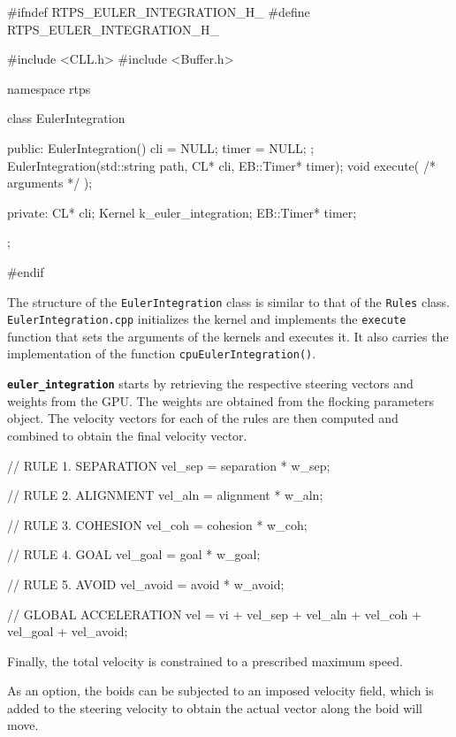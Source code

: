 \begin{cppcode}{0}
#ifndef RTPS_EULER_INTEGRATION_H_
#define RTPS_EULER_INTEGRATION_H_

#include <CLL.h>
#include <Buffer.h>

namespace rtps
{
	class EulerIntegration
	{
		public:
			EulerIntegration() { cli = NULL; timer = NULL; };
	 		EulerIntegration(std::string path, CL* cli, EB::Timer* timer);
			void execute( /* arguments */ );

		private:
			CL* cli;
			Kernel k_euler_integration;
			EB::Timer* timer;
	};
}
#endif
\end{cppcode}

The structure of the \texttt{EulerIntegration} class  
is similar to that of the \texttt{Rules} class. 
\texttt{EulerIntegration.cpp} initializes the kernel and implements the \texttt{execute} 
function that sets the arguments of the kernels and executes it. 
It also carries the implementation of the function \texttt{cpuEulerIntegration()}. 

\texttt{\textbf{euler\_integration}} starts by retrieving the respective steering vectors and weights
from the GPU.  
The weights are obtained from the flocking parameters object. 
The velocity vectors for each of the rules are then computed and combined to obtain 
the final velocity vector.

\begin{cppcode}{0}
// RULE 1. SEPARATION
vel_sep = separation * w_sep;
   
// RULE 2. ALIGNMENT
vel_aln = alignment * w_aln;

// RULE 3. COHESION
vel_coh = cohesion * w_coh;

// RULE 4. GOAL
vel_goal = goal * w_goal;

// RULE 5. AVOID
vel_avoid = avoid * w_avoid;

// GLOBAL ACCELERATION
vel = vi + vel_sep + vel_aln + vel_coh + vel_goal + vel_avoid;
\end{cppcode}

Finally, the total velocity  
is constrained to a prescribed maximum speed. 

As an option, the boids can be subjected to an imposed velocity field, which is added to the steering
velocity to obtain the actual vector along the boid will move.

